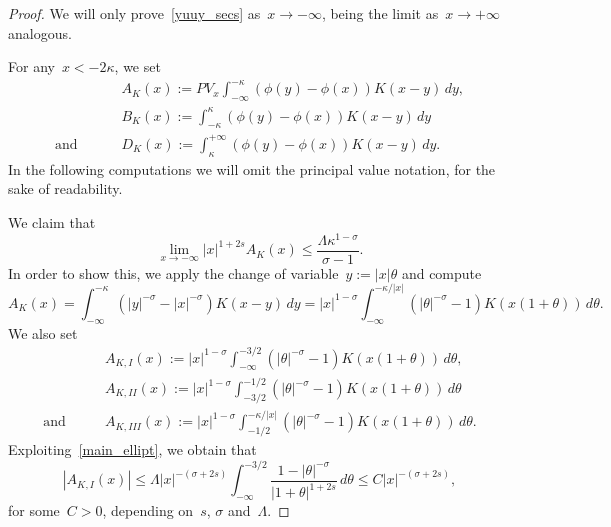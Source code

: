 \documentclass[10pt,a4paper]{amsart}
\begin{document}
\begin{proof}
We will only prove~\eqref{yuuy_secs} as~$x \to -\infty$, being
the limit as~$x\to +\infty$ analogous.

For any~$x<-2\kappa$, we set
\begin{equation}\label{52BIS}
\begin{split}
&A_K(x):= PV_x \int_{-\infty}^{-\kappa}\left( \phi(y)-\phi(x)\right) K(x-y)\, dy, \\ &B_K(x):= \int_{-\kappa}^{\kappa} \left( \phi(y) -\phi(x)\right) K(x-y) \, dy\\
{\mbox{and }}\qquad
&D_K(x):= \int_{\kappa}^{+\infty}\left( \phi(y)-\phi(x)\right) K(x-y)\, dy.
\end{split}
\end{equation}
In the following computations we will omit the principal value notation,
for the sake of readability.

We claim that 
\begin{equation}\label{x_secs}
\lim_{x \to -\infty} |x |^{1+2s} A_K(x) \leq  \frac{\Lambda\kappa^{1-\sigma}}{\sigma-1}.
\end{equation}
In order to show this, we apply the change of variable~$y:=|x|\theta$ and compute
\begin{equation*}
A_K(x) = \int_{-\infty}^{-\kappa} \left( | y |^{-\sigma} - |x |^{-\sigma} \right) K(x-y)\, dy 
= |x |^{1-\sigma} 
\int_{-\infty}^{-{\kappa}/{|x|}} \left( |\theta |^{-\sigma}-1\right) K\left( x (1+\theta)\right) \, d\theta.
\end{equation*}
We also set
\begin{equation}\label{53BIS}
\begin{split}
& A_{K,I}(x):= |x |^{1-\sigma} \int_{-\infty}^{-{3}/{2}}\left( |\theta |^{-\sigma}-1\right) K\left( x (1+\theta)\right) \, d\theta, \\
& A_{K,II}(x):=  |x |^{1-\sigma} 
\int_{-{3}/{2}}^{-{1}/{2}}\left(|\theta |^{-\sigma}-1\right) K\left( x (1+\theta)\right) \, d\theta \\ \mbox{and}\qquad
&A_{K,III}(x):=  | x |^{1-\sigma} \int_{-{1}/{2}}^{-{\kappa}/{| x|}}\left( | \theta |^{-\sigma}-1\right) K\left( x (1+\theta)\right) \, d\theta.
\end{split}
\end{equation}
Exploiting~\eqref{main_ellipt}, we obtain that
\begin{equation}\label{equno}
|A_{K,I}(x)| \leq \Lambda |x |^{-(\sigma+2s)}\int_{-\infty}^{-{3}/{2}}\frac{1- | \theta |^{-\sigma}}{| 1+\theta|^{1+2s}} \, d\theta \leq C |x |^{-(\sigma+2s)},
\end{equation}
for some~$C>0$, depending on~$s$, $\sigma$ and~$\Lambda$.


\end{proof}
\end{document}
